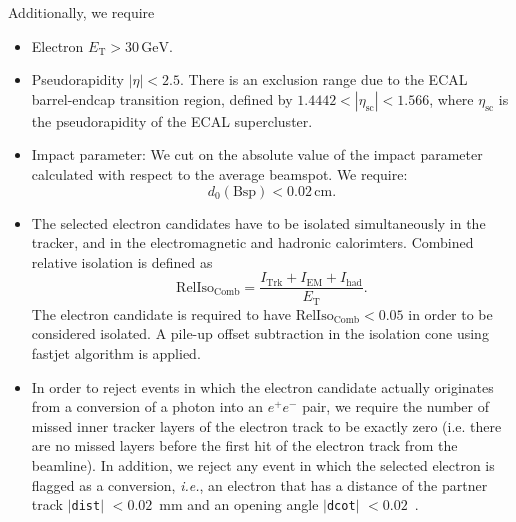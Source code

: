 Additionally, we require
\begin{itemize}
\item Electron $E_\mathrm{T} > 30\,\mathrm{GeV}$.
\item Pseudorapidity $|\eta| < 2.5$. There is an exclusion range due
        to the ECAL barrel-endcap transition region, defined by
        $1.4442 < |\eta_{\mathrm{sc}}| < 1.566$, where
        $\eta_{\mathrm{sc}}$ is the pseudorapidity of the ECAL
        supercluster.
\item Impact parameter: We cut on the absolute value of the impact
       parameter calculated with respect to the average beamspot. We
       require:
\begin{equation*}
 d_0(\mathrm{Bsp}) < 0.02\,\mathrm{cm}.    
\end{equation*}
\item The selected electron candidates have to be isolated simultaneously in
the tracker, and in the electromagnetic and hadronic calorimters.  Combined
relative isolation is defined as
\begin{equation*}
\mathrm{RelIso_{\mathrm{Comb}}} = \frac{I_{\mathrm{Trk}}+I_{\mathrm{EM}}+I_{\mathrm{had}}}{E_\mathrm{T}}.
\end{equation*} 
The electron candidate is required to have 
$\mathrm{RelIso_{\mathrm{Comb}}} < 0.05$ in order 
to be considered isolated. 
A pile-up offset subtraction in the isolation cone 
using fastjet algorithm \cite{FastJetPUSubtraction} is applied.
\item 
In order to reject events in which the electron candidate actually
originates from a conversion of a photon into an $e^{+}e^{-}$ pair, we
require the number of missed inner tracker layers of the electron
track to be exactly zero (i.e. there are no missed layers before the
first hit of the electron track from the beamline). In addition, we
reject any event in which the selected electron is flagged as a
conversion, \textit{i.e.}, an electron that has a 
distance of the partner track $|$\texttt{dist}$|$ $< 0.02$~mm and an
opening angle $|$\texttt{dcot}$|$ $< 0.02$~\cite{ConversionRejection}.
\end{itemize}
